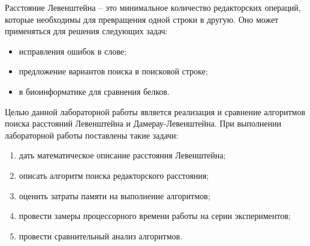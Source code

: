 \Introduction
Расстояние Левенштейна -- это минимальное количество редакторских операций, которые необходимы для превращения одной строки в другую.
Оно может применяться для решения следующих задач:
\begin{itemize}
	\item исправления ошибок в слове;
	\item предложение вариантов поиска в поисковой строке;
	\item в биоинформатике для сравнения белков.
\end{itemize}
Целью данной лабораторной работы является реализация и сравнение алгоритмов поиска расстояний Левенштейна и Дамерау-Левенштейна.
При выполнении лабораторной работы поставлены такие задачи:
\begin{enumerate}[1)]
	\item дать математическое описание расстояния Левенштейна;
	\item описать алгоритм поиска редакторского расстояния;
	\item оценить затраты памяти на выполнение алгоритмов;
	\item провести замеры процессорного времени работы на серии экспериментов;
	\item провести сравнительный анализ алгоритмов.
\end{enumerate}